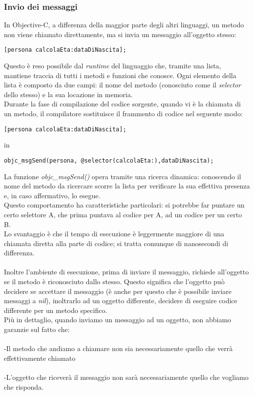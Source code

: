 \subsubsection{Invio dei messaggi}
In Objective-C, a differenza della maggior parte degli altri linguaggi, un metodo non viene chiamato direttamente, ma si invia un messaggio all'oggetto stesso: 
\lstset{language=[Objective]C, breakindent=40pt, breaklines}
\begin{lstlisting}
[persona calcolaEta:dataDiNascita];
\end{lstlisting}
Questo è reso possibile dal \textit{runtime} del linguaggio che, tramite una lista, mantiene traccia di tutti i metodi e funzioni che conosce. Ogni elemento della lista è composto da due campi: il nome del metodo (conosciuto come il \textit{selector} dello stesso) e la sua locazione in memoria.
\\Durante la fase di compilazione del codice sorgente, quando vi è la chiamata di un metodo, il compilatore sostituisce il frammento di codice nel seguente modo:
\lstset{language=[Objective]C, breakindent=40pt, breaklines}
\begin{lstlisting}
[persona calcolaEta:dataDiNascita];
\end{lstlisting}
in \lstset{language=[Objective]C, breakindent=40pt, breaklines}
\begin{lstlisting}
objc_msgSend(persona, @selector(calcolaEta:),dataDiNascita);
\end{lstlisting}
\bigskip
\bigskip
La funzione \textit{objc\_msgSend()} opera tramite una ricerca dinamica: conoscendo il nome del metodo da ricercare scorre la lista per verificare la sua effettiva presenza e, in caso affermativo, lo esegue.\\ 
Questo comportamento ha caratteristiche particolari: si potrebbe far puntare un certo selettore A, che prima puntava al codice per A, ad un codice per un certo B.\\ 
Lo svantaggio è che il tempo di esecuzione è leggermente maggiore di una chiamata diretta alla parte di codice; si tratta comunque di nanosecondi di differenza.\\
\\Inoltre l'ambiente di esecuzione, prima di inviare il messaggio, richiede all’oggetto se il metodo è riconosciuto dallo stesso. Questo significa che l’oggetto può decidere se accettare il messaggio (è anche per questo che è possibile inviare messaggi a \textit{nil}), inoltrarlo ad un oggetto differente, decidere di eseguire codice differente per un metodo specifico.\\Più in dettaglio, quando inviamo un messaggio ad un oggetto, non abbiamo garanzie sul fatto che:\\ \\-Il metodo che andiamo a chiamare non sia necessariamente quello che verrà effettivamente chiamato\\\\-L’oggetto che riceverà il messaggio non sarà necessariamente quello che vogliamo che risponda.
